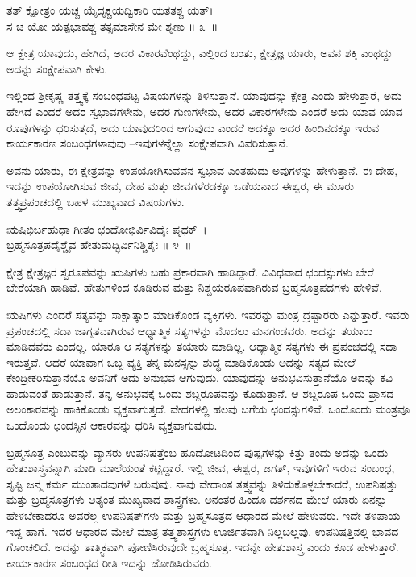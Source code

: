 \begin{shloka}
ತತ್ ಕ್ಷೋತ್ರಂ ಯಚ್ಚ ಯೈದೃಕ್ಚಯದ್ವಿಕಾರಿ ಯತತಶ್ಚ ಯತ್​।\\ಸ ಚ ಯೋ ಯತ್ಪಭಾವಶ್ಚ ತತ್ಸಮಾಸೇನ ಮೇ ಶೃಣು \hfill॥ ೩~॥
\end{shloka}

\begin{artha}
ಆ ಕ್ಷೇತ್ರ ಯಾವುದು, ಹೇಗಿದೆ, ಅದರ ವಿಕಾರವೆಂಥದ್ದು, ಎಲ್ಲಿಂದ ಬಂತು, ಕ್ಷೇತ್ರಜ್ಞ ಯಾರು, ಅವನ ಶಕ್ತಿ ಎಂಥದ್ದು ಅದನ್ನು ಸಂಕ್ಷೇಪವಾಗಿ ಕೇಳು.
\end{artha}

ಇಲ್ಲಿಂದ ಶ‍್ರೀಕೃಷ್ಣ ತತ್ತ್ವಕ್ಕೆ ಸಂಬಂಧಪಟ್ಟ ವಿಷಯಗಳನ್ನು ತಿಳಿಸುತ್ತಾನೆ. ಯಾವುದನ್ನು ಕ್ಷೇತ್ರ ಎಂದು ಹೇಳುತ್ತಾರೆ, ಅದು ಹೇಗಿದೆ ಎಂದರೆ ಅದರ ಸ್ವಭಾವಗಳೇನು, ಅದರ ಗುಣಗಳೇನು, ಅದರ ವಿಕಾರಗಳೇನು ಎಂದರೆ ಅದು ಯಾವ ಯಾವ ರೂಪುಗಳನ್ನು ಧರಿಸುತ್ತದೆ, ಅದು ಯಾವುದರಿಂದ ಆಗುವುದು ಎಂದರೆ ಅದಕ್ಕೂ ಅದರ ಹಿಂದಿನದಕ್ಕೂ ಇರುವ ಕಾರ್ಯಕಾರಣ ಸಂಬಂಧಗಳಾವುವು –ಇವುಗಳನ್ನೆಲ್ಲಾ ಸಂಕ್ಷೇಪವಾಗಿ ವಿವರಿಸುತ್ತಾನೆ.

ಅವನು ಯಾರು, ಈ ಕ್ಷೇತ್ರವನ್ನು ಉಪಯೋಗಿಸುವವನ ಸ್ವಭಾವ ಎಂತಹುದು ಅವುಗಳನ್ನು ಹೇಳುತ್ತಾನೆ. ಈ ದೇಹ, ಇದನ್ನು ಉಪಯೋಗಿಸುವ ಜೀವ, ದೇಹ ಮತ್ತು ಜೀವಗಳೆರಡಕ್ಕೂ ಒಡೆಯನಾದ ಈಶ್ವರ, ಈ ಮೂರು ತತ್ತ್ವಪ್ರಪಂಚದಲ್ಲಿ ಬಹಳ ಮುಖ್ಯವಾದ ವಿಷಯಗಳು.

\begin{shloka}
ಋಷಿಭಿರ್ಬಹುಧಾ ಗೀತಂ ಛಂದೋಭಿರ್ವಿವಿಧೈಃ ಪೃಥಕ್~।\\ಬ್ರಹ್ಮಸೂತ್ರಪದೈಶ್ಚೈವ ಹೇತುಮದ್ಭಿರ್ವಿನಿಶ್ಚಿತೈಃ \hfill॥ ೪~॥
\end{shloka}

\begin{artha}
ಕ್ಷೇತ್ರ ಕ್ಷೇತ್ರಜ್ಞರ ಸ್ವರೂಪವನ್ನು ಋಷಿಗಳು ಬಹು ಪ್ರಕಾರವಾಗಿ ಹಾಡಿದ್ದಾರೆ. ವಿವಿಧವಾದ ಛಂದಸ್ಸುಗಳು ಬೇರೆ ಬೇರೆಯಾಗಿ ಹಾಡಿವೆ. ಹೇತುಗಳಿಂದ ಕೂಡಿರುವ ಮತ್ತು ನಿಶ್ಚಯರೂಪವಾಗಿರುವ ಬ್ರಹ್ಮಸೂತ್ರಪದಗಳು ಹೇಳಿವೆ.
\end{artha}

ಋಷಿಗಳು ಎಂದರೆ ಸತ್ಯವನ್ನು ಸಾಕ್ಷಾತ್ಕಾರ ಮಾಡಿಕೊಂಡ ವ್ಯಕ್ತಿಗಳು. ಇವರನ್ನು ಮಂತ್ರ ದ್ರಷ್ಟಾರರು ಎನ್ನುತ್ತಾರೆ. ಇವರು ಪ್ರಪಂಚದಲ್ಲಿ ಸದಾ ಜಾಗೃತವಾಗಿರುವ ಆಧ್ಯಾತ್ಮಿಕ ಸತ್ಯಗಳನ್ನು ಮೊದಲು ಮನಗಂಡವರು. ಅದನ್ನು ತಯಾರು ಮಾಡಿದವರು ಎಂದಲ್ಲ. ಯಾರೂ ಆ ಸತ್ಯಗಳನ್ನು ತಯಾರು ಮಾಡಿಲ್ಲ. ಆಧ್ಯಾತ್ಮಿಕ ಸತ್ಯಗಳು ಈ ಪ್ರಪಂಚದಲ್ಲಿ ಸದಾ ಇರುತ್ತವೆ. ಆದರೆ ಯಾವಾಗ ಒಬ್ಬ ವ್ಯಕ್ತಿ ತನ್ನ ಮನಸ್ಸನ್ನು ಶುದ್ಧ ಮಾಡಿಕೊಂಡು ಅದನ್ನು ಸತ್ಯದ ಮೇಲೆ ಕೇಂದ್ರೀಕರಿಸುತ್ತಾನೆಯೊ ಅವನಿಗೆ ಅದು ಅನುಭವ ಆಗುವುದು. ಯಾವುದನ್ನು ಅನುಭವಿಸು\-ತ್ತಾನೆಯೊ ಅದನ್ನು ಕವಿ ಹಾಡುವಂತೆ ಹಾಡುತ್ತಾನೆ. ತನ್ನ ಅನುಭವಕ್ಕೆ ಒಂದು ಶಬ್ದರೂಪವನ್ನು ಕೊಡುತ್ತಾನೆ. ಆ ಶಬ್ದರೂಪ ಒಂದು ಪ್ರಾಸದ ಅಲಂಕಾರವನ್ನು ಹಾಕಿಕೊಂಡು ವ್ಯಕ್ತವಾಗುತ್ತದೆ. ವೇದಗಳಲ್ಲಿ ಹಲವು ಬಗೆಯ ಛಂದಸ್ಸುಗಳಿವೆ. ಒಂದೊಂದು ಮಂತ್ರವೂ ಒಂದೊಂದು ಛಂದಸ್ಸಿನ ಆಕಾರವನ್ನು ಧರಿಸಿ ವ್ಯಕ್ತವಾಗುವುದು.

ಬ್ರಹ್ಮಸೂತ್ರ ಎಂಬುದನ್ನು ವ್ಯಾಸರು ಉಪನಿಷತ್ತೆಂಬ ಹೂದೋಟದಿಂದ ಪುಷ್ಪಗಳನ್ನು ಕಿತ್ತು ತಂದು ಅದನ್ನು ಒಂದು ಹೇತುಶಾಸ್ತ್ರವನ್ನಾಗಿ ಮಾಡಿ ಮಾಲೆಯಂತೆ ಕಟ್ಟಿದ್ದಾರೆ. ಇಲ್ಲಿ ಜೀವ, ಈಶ್ವರ, ಜಗತ್, ಇವುಗಳಿಗೆ ಇರುವ ಸಂಬಂಧ, ಸೃಷ್ಟಿ ಜನ್ಮ ಕರ್ಮ ಮುಂತಾದವುಗಳೆ ಬರುವುವು. ನಾವು ವೇದಾಂತ ತತ್ತ್ವವನ್ನು ತಿಳಿದುಕೊಳ್ಳಬೇಕಾದರೆ, ಉಪನಿಷತ್ತು ಮತ್ತು ಬ್ರಹ್ಮಸೂತ್ರಗಳು ಅತ್ಯಂತ ಮುಖ್ಯವಾದ ಶಾಸ್ತ್ರಗಳು. ಅನಂತರ ಹಿಂದೂ ದರ್ಶನದ ಮೇಲೆ ಯಾರು ಏನನ್ನು ಹೇಳಬೇಕಾದರೂ ಅವರೆಲ್ಲ ಉಪನಿಷತ್​ಗಳು ಮತ್ತು ಬ್ರಹ್ಮಸೂತ್ರದ ಆಧಾರದ ಮೇಲೆ ಹೇಳುವರು. ಇದೇ ತಳಪಾಯ ಇದ್ದ ಹಾಗೆ. ಇದರ ಆಧಾರದ ಮೇಲೆ ಮಾತ್ರ ತತ್ತ್ವಶಾಸ್ತ್ರಗಳು ಊರ್ಜಿತವಾಗಿ ನಿಲ್ಲಬಲ್ಲವು. ಉಪನಿಷತ್ತಿನಲ್ಲಿ ಭಾವದ ಗೊಂಚಲಿದೆ. ಅದನ್ನು ತಾತ್ತ್ವಿಕವಾಗಿ ಪೋಣಿಸಿರುವುದೇ ಬ್ರಹ್ಮಸೂತ್ರ. ಇದನ್ನೇ ಹೇತುಶಾಸ್ತ್ರ ಎಂದು ಕೂಡ ಹೇಳುತ್ತಾರೆ. ಕಾರ್ಯಕಾರಣ ಸಂಬಂಧದ ರೀತಿ ಇದನ್ನು ಜೋಡಿಸಿರುವರು.

